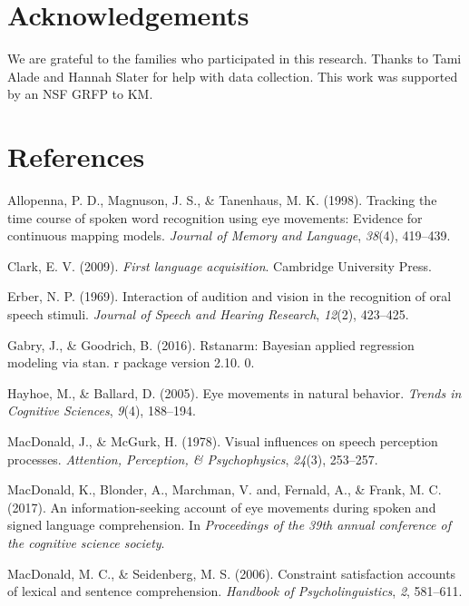 \documentclass[10pt, letterpaper]{article}
\begin{document}
\section{Acknowledgements}\label{acknowledgements}

We are grateful to the families who participated in this research.
Thanks to Tami Alade and Hannah Slater for help with data collection.
This work was supported by an NSF GRFP to KM.

\section{References}\label{references}

\setlength{\parindent}{-0.1in} \setlength{\leftskip}{0.125in} \noindent

\hypertarget{refs}{}
\hypertarget{ref-allopenna1998tracking}{}
Allopenna, P. D., Magnuson, J. S., \& Tanenhaus, M. K. (1998). Tracking
the time course of spoken word recognition using eye movements: Evidence
for continuous mapping models. \emph{Journal of Memory and Language},
\emph{38}(4), 419--439.

\hypertarget{ref-clark2009first}{}
Clark, E. V. (2009). \emph{First language acquisition}. Cambridge
University Press.

\hypertarget{ref-erber1969interaction}{}
Erber, N. P. (1969). Interaction of audition and vision in the
recognition of oral speech stimuli. \emph{Journal of Speech and Hearing
Research}, \emph{12}(2), 423--425.

\hypertarget{ref-gabry2016rstanarm}{}
Gabry, J., \& Goodrich, B. (2016). Rstanarm: Bayesian applied regression
modeling via stan. r package version 2.10. 0.

\hypertarget{ref-hayhoe2005eye}{}
Hayhoe, M., \& Ballard, D. (2005). Eye movements in natural behavior.
\emph{Trends in Cognitive Sciences}, \emph{9}(4), 188--194.

\hypertarget{ref-macdonald1978visual}{}
MacDonald, J., \& McGurk, H. (1978). Visual influences on speech
perception processes. \emph{Attention, Perception, \& Psychophysics},
\emph{24}(3), 253--257.

\hypertarget{ref-macdonald2017info}{}
MacDonald, K., Blonder, A., Marchman, V. and, Fernald, A., \& Frank, M.
C. (2017). An information-seeking account of eye movements during spoken
and signed language comprehension. In \emph{Proceedings of the 39th
annual conference of the cognitive science society}.

\hypertarget{ref-macdonald2006constraint}{}
MacDonald, M. C., \& Seidenberg, M. S. (2006). Constraint satisfaction
accounts of lexical and sentence comprehension. \emph{Handbook of
Psycholinguistics}, \emph{2}, 581--611.
\end{document}

